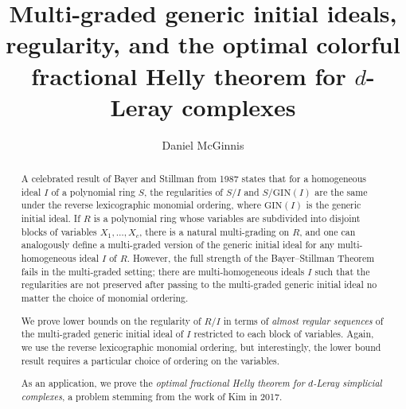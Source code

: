 \documentclass[a4paper, 10pt, reqno, english, ones]{amsart}  %
\theoremstyle{definition}
\theoremstyle{remark}
\begin{document}
\title[]{Multi-graded generic initial ideals, regularity, and the optimal colorful fractional Helly theorem for $d$-Leray complexes}


\author[]{Daniel McGinnis} 
\address{Discrete Mathematics Group, Institute for Basic Science (IBS), Daejeon,
South Korea}








\begin{abstract}
    A celebrated result of Bayer and Stillman from 1987 states that for a homogeneous ideal $I$ of a polynomial ring $S$, the regularities of $S/I$ and $S/\textrm{GIN}(I)$ are the same under the reverse lexicographic monomial ordering, where $\textrm{GIN}(I)$ is the generic initial ideal. If $R$ is a polynomial ring whose variables are subdivided into disjoint blocks of variables $X_1,\dots,X_c$, there is  a natural multi-grading on $R$, and one can analogously define a multi-graded version of the generic initial ideal for any multi-homogeneous ideal $I$ of $R$. However, the full strength of the Bayer--Stillman Theorem fails in the multi-graded setting; there are multi-homogeneous ideals $I$ such that the regularities are not preserved after passing to the multi-graded generic initial ideal no matter the choice of monomial ordering.

    We prove lower bounds on the regularity of $R/I$ in terms of \textit{almost regular sequences} of the multi-graded generic initial ideal of $I$ restricted to each block of variables. Again, we use the reverse lexicographic monomial ordering, but interestingly, the lower bound result requires a particular choice of ordering on the variables. 
    
    As an application, we prove the \textit{optimal fractional Helly theorem for $d$-Leray simplicial complexes}, a problem stemming from the work of Kim in 2017.
\end{abstract}
\end{document}
